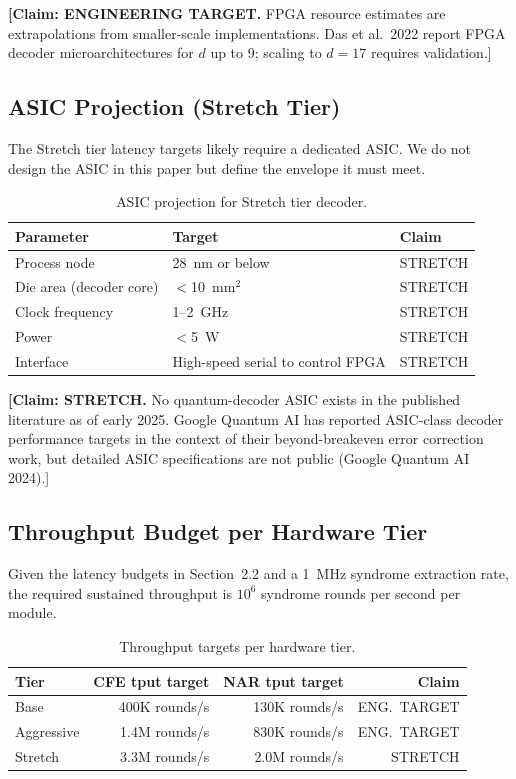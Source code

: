 \documentclass[conference]{IEEEtran}
\begin{document}
\textbf{[Claim: ENGINEERING TARGET.} FPGA resource estimates are extrapolations from smaller-scale implementations. Das et al.\ 2022 report FPGA decoder microarchitectures for $d$ up to 9; scaling to $d = 17$ requires validation.]

\subsection{ASIC Projection (Stretch Tier)}

The Stretch tier latency targets likely require a dedicated ASIC. We do not design the ASIC in this paper but define the envelope it must meet.

\begin{table}[H]
\centering
\caption{ASIC projection for Stretch tier decoder.}
\label{tab:asic-projection}
\footnotesize
\begin{tabularx}{\columnwidth}{L{2.5cm}L{2.5cm}l}
\toprule
\textbf{Parameter} & \textbf{Target} & \textbf{Claim} \\
\midrule
Process node & 28~nm or below & STRETCH \\
Die area (decoder core) & $<$10~mm$^2$ & STRETCH \\
Clock frequency & 1--2~GHz & STRETCH \\
Power & $<$5~W & STRETCH \\
Interface & High-speed serial to control FPGA & STRETCH \\
\bottomrule
\end{tabularx}
\end{table}

\textbf{[Claim: STRETCH.} No quantum-decoder ASIC exists in the published literature as of early 2025. Google Quantum AI has reported ASIC-class decoder performance targets in the context of their beyond-breakeven error correction work, but detailed ASIC specifications are not public (Google Quantum AI 2024).]

\subsection{Throughput Budget per Hardware Tier}

Given the latency budgets in Section~2.2 and a 1~MHz syndrome extraction rate, the required sustained throughput is $10^6$ syndrome rounds per second per module.

\begin{table}[H]
\centering
\caption{Throughput targets per hardware tier.}
\label{tab:throughput-budget}
\footnotesize
\begin{tabularx}{\columnwidth}{lrrr}
\toprule
\textbf{Tier} & \textbf{CFE tput target} & \textbf{NAR tput target} & \textbf{Claim} \\
\midrule
Base & 400K rounds/s & 130K rounds/s & ENG.\ TARGET \\
Aggressive & 1.4M rounds/s & 830K rounds/s & ENG.\ TARGET \\
Stretch & 3.3M rounds/s & 2.0M rounds/s & STRETCH \\
\bottomrule
\end{tabularx}
\end{table}
\end{document}
